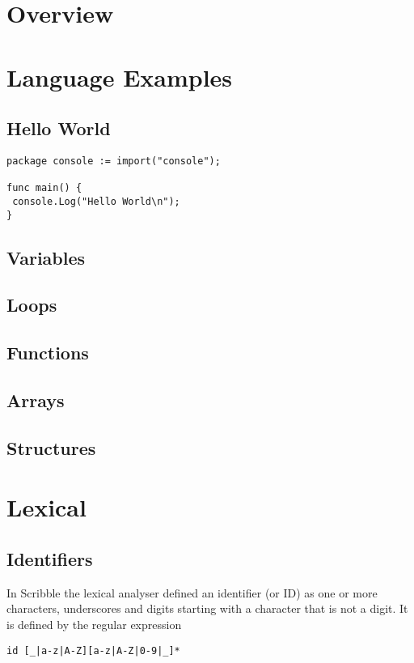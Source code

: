 \documentclass[]{final_report}
\begin{document}
\chapter{Overview}

\chapter{Language Examples}

\section{Hello World}

\begin{verbatim}
package console := import("console");

func main() {
 console.Log("Hello World\n");
}
\end{verbatim}

\section{Variables}
\section{Loops}
\section{Functions}
\section{Arrays}
\section{Structures}

\chapter{Lexical}

\section{Identifiers}

In Scribble the lexical analyser defined an identifier (or ID) as one or more characters, underscores and digits starting with a character that is not a digit. It is defined by the regular expression
\begin{verbatim}
id [_|a-z|A-Z][a-z|A-Z|0-9|_]*
\end{verbatim}
\end{document}
